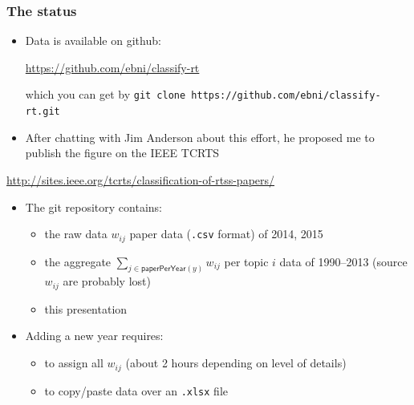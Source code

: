 \documentclass[ignorenonframetext,mathserif]{beamer} %
\begin{document}
  

\begin{frame}[fragile]
  \frametitle{The status}

  \begin{itemize}
  \item Data is available on github:
    \begin{center}
      \url{https://github.com/ebni/classify-rt}
    \end{center}
    which you can get by
    \verb|git clone https://github.com/ebni/classify-rt.git|
  \item After chatting with Jim Anderson about this effort, he
    proposed me to publish the figure on the IEEE TCRTS
  \end{itemize}
  \begin{center}
    \url{http://sites.ieee.org/tcrts/classification-of-rtss-papers/}
  \end{center}
  \begin{itemize}
  \item The git repository contains:
    \begin{itemize}
    \item the raw data $w_{ij}$ paper data (\texttt{.csv} format) of
      2014, 2015
    \item the aggregate $\sum_{j\in\mathsf{paperPerYear}(y)}w_{ij}$
      per topic $i$ data of 1990--2013 (source $w_{ij}$ are probably
      lost)
    \item this presentation
    \end{itemize}
  \item Adding a new year requires:
    \begin{itemize}
    \item to assign all $w_{ij}$ (about 2 hours depending on level of details)
    \item to copy/paste data over an \texttt{.xlsx} file 
    \end{itemize}
  \end{itemize}
\end{frame}
\end{document}
